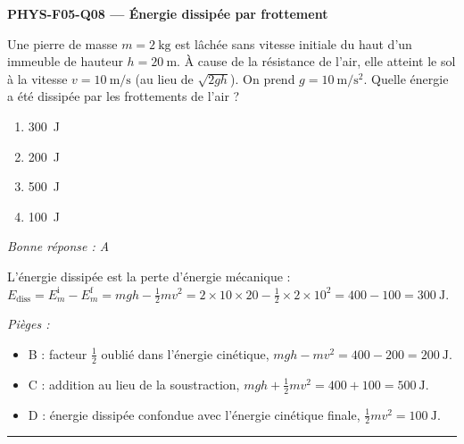\documentclass[11pt,a4paper]{article}
\begin{document}
\noindent\textbf{PHYS-F05-Q08 --- Énergie dissipée par frottement}\par
Une pierre de masse $m=\qty{2}{\kilogram}$ est lâchée sans vitesse initiale du haut d'un immeuble de
hauteur $h=\qty{20}{\metre}$. À cause de la résistance de l'air, elle atteint le sol à la vitesse
$v=\qty{10}{\metre\per\second}$ (au lieu de $\sqrt{2gh}$). On prend $g=\qty{10}{\metre\per\second\squared}$.
Quelle énergie a été dissipée par les frottements de l'air ?
\begin{enumerate}[label=\Alph*)]
\item \qty{300}{\joule}
\item \qty{200}{\joule}
\item \qty{500}{\joule}
\item \qty{100}{\joule}
\end{enumerate}
\textit{Bonne réponse : A}\par
L'énergie dissipée est la perte d'énergie mécanique :
$E_{\text{diss}}=E_m^{\text{i}}-E_m^{\text{f}}=mgh-\tfrac12 m v^2=2\times10\times20-\tfrac12\times2\times10^2=400-100=\qty{300}{\joule}$.\par
\textit{Pièges :}
\begin{itemize}
\item B : facteur $\tfrac12$ oublié dans l'énergie cinétique, $mgh-m v^2=400-200=\qty{200}{\joule}$.
\item C : addition au lieu de la soustraction, $mgh+\tfrac12 m v^2=400+100=\qty{500}{\joule}$.
\item D : énergie dissipée confondue avec l'énergie cinétique finale, $\tfrac12 m v^2=\qty{100}{\joule}$.
\end{itemize}
\vspace{8pt}\hrule\vspace{8pt}
\end{document}
